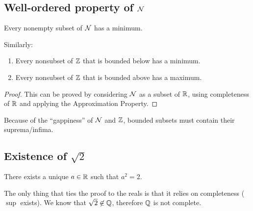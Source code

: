 \subsection{Well-ordered property of $\mathcal{N}$}
\begin{theorem*}\hspace{0pt}
  Every nonempty subset of $\mathcal{N}$ has a minimum.
\end{theorem*}

\begin{remark*}
  Similarly:
  \begin{enumerate}
    \item Every nonsubset of $\mathbb{Z}$ that is bounded below has a minimum.
    \item Every nonsubset of $\mathbb{Z}$ that is bounded above has a maximum.
  \end{enumerate}
\end{remark*}

\begin{proof}
  This can be proved by considering $\mathcal{N}$ as a subset of $\mathbb{R}$, using completeness of $\mathbb{R}$ and
  applying the Approximation Property.
\end{proof}

\begin{intuition*}
  Because of the ``gappiness'' of $\mathcal{N}$ and $\mathbb{Z}$, bounded subsets must contain their suprema/infima.
\end{intuition*}

\subsection{Existence of $\sqrt 2$}
\begin{theorem*}
  There exists a unique $a \in \mathbb{R}$ such that $a^2 = 2$.
\end{theorem*}

\begin{remark*}
  The only thing that ties the proof to the reals is that it relies on completeness ($\sup$
  exists). We know that $\sqrt 2 \not\in \mathbb{Q}$, therefore $\mathbb{Q}$ is not complete.
\end{remark*}

